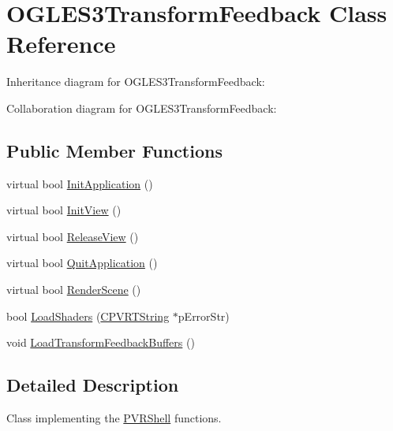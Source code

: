 \hypertarget{class_o_g_l_e_s3_transform_feedback}{\section{O\+G\+L\+E\+S3\+Transform\+Feedback Class Reference}
\label{class_o_g_l_e_s3_transform_feedback}
}


Inheritance diagram for O\+G\+L\+E\+S3\+Transform\+Feedback\+:


Collaboration diagram for O\+G\+L\+E\+S3\+Transform\+Feedback\+:
\subsection*{Public Member Functions}
\begin{DoxyCompactItemize}
\item 
virtual bool \hyperlink{class_o_g_l_e_s3_transform_feedback_a387c8a67609244327560edd9f6586a08}{Init\+Application} ()
\item 
virtual bool \hyperlink{class_o_g_l_e_s3_transform_feedback_a88778f94648bed8001a04435da382199}{Init\+View} ()
\item 
virtual bool \hyperlink{class_o_g_l_e_s3_transform_feedback_a1576a24913021638ecb9c87bed460b22}{Release\+View} ()
\item 
virtual bool \hyperlink{class_o_g_l_e_s3_transform_feedback_ab11e24dc17e0d17449818ad18b029d69}{Quit\+Application} ()
\item 
virtual bool \hyperlink{class_o_g_l_e_s3_transform_feedback_a36d0672be66e6685708bb0c5a25715f0}{Render\+Scene} ()
\item 
bool \hyperlink{class_o_g_l_e_s3_transform_feedback_a1a709a8e8c58a2fc5670b45dfb2861d5}{Load\+Shaders} (\hyperlink{class_c_p_v_r_t_string}{C\+P\+V\+R\+T\+String} $\ast$p\+Error\+Str)
\item 
void \hyperlink{class_o_g_l_e_s3_transform_feedback_a260acfbf6e657bce17b71d2be28c4c5d}{Load\+Transform\+Feedback\+Buffers} ()
\end{DoxyCompactItemize}


\subsection{Detailed Description}


 Class implementing the \hyperlink{class_p_v_r_shell}{P\+V\+R\+Shell} functions. 

